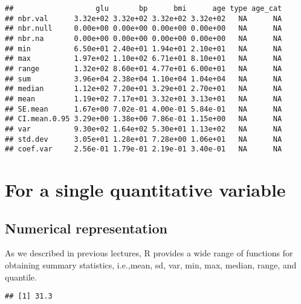 \documentclass[]{book}
\newenvironment{Shaded}{\begin{snugshade}}{\end{snugshade}}
\newcommand{\KeywordTok}[1]{\textcolor[rgb]{0.13,0.29,0.53}{\textbf{#1}}}
\newcommand{\OperatorTok}[1]{\textcolor[rgb]{0.81,0.36,0.00}{\textbf{#1}}}
\newcommand{\NormalTok}[1]{#1}
\theoremstyle{definition}
\theoremstyle{definition}
\theoremstyle{definition}
\theoremstyle{remark}
\begin{document}
\begin{verbatim}
##                   glu       bp      bmi      age type age_cat
## nbr.val      3.32e+02 3.32e+02 3.32e+02 3.32e+02   NA      NA
## nbr.null     0.00e+00 0.00e+00 0.00e+00 0.00e+00   NA      NA
## nbr.na       0.00e+00 0.00e+00 0.00e+00 0.00e+00   NA      NA
## min          6.50e+01 2.40e+01 1.94e+01 2.10e+01   NA      NA
## max          1.97e+02 1.10e+02 6.71e+01 8.10e+01   NA      NA
## range        1.32e+02 8.60e+01 4.77e+01 6.00e+01   NA      NA
## sum          3.96e+04 2.38e+04 1.10e+04 1.04e+04   NA      NA
## median       1.12e+02 7.20e+01 3.29e+01 2.70e+01   NA      NA
## mean         1.19e+02 7.17e+01 3.32e+01 3.13e+01   NA      NA
## SE.mean      1.67e+00 7.02e-01 4.00e-01 5.84e-01   NA      NA
## CI.mean.0.95 3.29e+00 1.38e+00 7.86e-01 1.15e+00   NA      NA
## var          9.30e+02 1.64e+02 5.30e+01 1.13e+02   NA      NA
## std.dev      3.05e+01 1.28e+01 7.28e+00 1.06e+01   NA      NA
## coef.var     2.56e-01 1.79e-01 2.19e-01 3.40e-01   NA      NA
\end{verbatim}

\section{For a single quantitative
variable}\label{for-a-single-quantitative-variable}

\subsection{Numerical representation}\label{numerical-representation}

As we described in previous lectures, R provides a wide range of
functions for obtaining summary statistics, i.e.,mean, sd, var, min,
max, median, range, and quantile.

\begin{Shaded}
\end{Shaded}

\begin{verbatim}
## [1] 31.3
\end{verbatim}

\begin{Shaded}
\end{Shaded}
\end{document}
